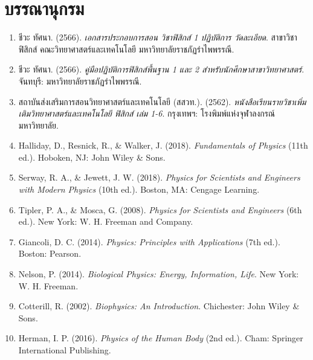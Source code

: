 \chapter*{บรรณานุกรม}

\begin{enumerate}
    \item ชีวะ ทัศนา. (2566). \textit{เอกสารประกอบการสอน วิชาฟิสิกส์ 1 ปฏิบัติการ วัดละเอียด}. สาขาวิชาฟิสิกส์ คณะวิทยาศาสตร์และเทคโนโลยี มหาวิทยาลัยราชภัฏรำไพพรรณี.
    \item ชีวะ ทัศนา. (2566). \textit{คู่มือปฏิบัติการฟิสิกส์พื้นฐาน 1 และ 2 สำหรับนักศึกษาสาขาวิทยาศาสตร์}. จันทบุรี: มหาวิทยาลัยราชภัฏรำไพพรรณี.
    \item สถาบันส่งเสริมการสอนวิทยาศาสตร์และเทคโนโลยี (สสวท.). (2562). \textit{หนังสือเรียนรายวิชาเพิ่มเติมวิทยาศาสตร์และเทคโนโลยี ฟิสิกส์ เล่ม 1-6}. กรุงเทพฯ: โรงพิมพ์แห่งจุฬาลงกรณ์มหาวิทยาลัย.
    \item Halliday, D., Resnick, R., \& Walker, J. (2018). \textit{Fundamentals of Physics} (11th ed.). Hoboken, NJ: John Wiley \& Sons.
    \item Serway, R. A., \& Jewett, J. W. (2018). \textit{Physics for Scientists and Engineers with Modern Physics} (10th ed.). Boston, MA: Cengage Learning.
    \item Tipler, P. A., \& Mosca, G. (2008). \textit{Physics for Scientists and Engineers} (6th ed.). New York: W. H. Freeman and Company.
    \item Giancoli, D. C. (2014). \textit{Physics: Principles with Applications} (7th ed.). Boston: Pearson.
    \item Nelson, P. (2014). \textit{Biological Physics: Energy, Information, Life}. New York: W. H. Freeman.
    \item Cotterill, R. (2002). \textit{Biophysics: An Introduction}. Chichester: John Wiley \& Sons.
    \item Herman, I. P. (2016). \textit{Physics of the Human Body} (2nd ed.). Cham: Springer International Publishing.
\end{enumerate}

